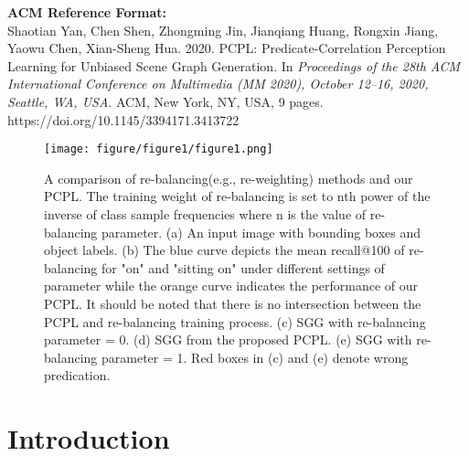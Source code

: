 \documentclass[sigconf]{acmart}
\begin{document}


\maketitle

{\small\textbf{ACM Reference Format:}\\
Shaotian Yan, Chen Shen, Zhongming Jin,  Jianqiang Huang,  Rongxin  Jiang,  Yaowu Chen,  Xian-Sheng Hua. 2020. PCPL: Predicate-Correlation  Perception Learning for Unbiased Scene Graph Generation. In  \emph{Proceedings of the 28th ACM International Conference on  Multimedia (MM 2020), October 12--16, 2020, Seattle, WA, USA}. ACM,  New York, NY, USA, 9 pages. \\ https://doi.org/10.1145/3394171.3413722}


\begin{figure}
    \centering
    \texttt{[image: figure/figure1/figure1.png]}
    \caption{A comparison of re-balancing(e.g., re-weighting) methods and our PCPL. The training weight of re-balancing is set to nth power of the inverse of class sample frequencies where n is the value of re-balancing parameter. (a) An input image with bounding boxes and object labels. (b) The blue curve depicts the mean recall@100 of re-balancing for "on" and "sitting on" under different settings of parameter while the orange curve indicates the performance of our PCPL. It should be noted that 
    there is no intersection between the PCPL and re-balancing training process. (c) SGG with re-balancing parameter = 0. (d) SGG from the proposed PCPL. (e) SGG with re-balancing parameter = 1. Red boxes in (c) and (e) denote wrong predication.}
    \label{fig:1}
\end{figure}


\section{Introduction}
\end{document}
